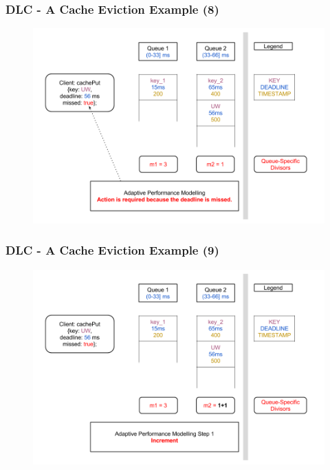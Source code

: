 \documentclass{beamer}
\begin{document}
\begin{frame}
  \frametitle{DLC - A Cache Eviction Example (8)}
  \begin{figure}
    \begin{center}
      \centerline{\includegraphics[scale=0.33]{img/DLC_V6_8.png}}
    \end{center}
  \end{figure}
\end{frame}

\begin{frame}
  \frametitle{DLC - A Cache Eviction Example (9)}
  \begin{figure}
    \begin{center}
      \centerline{\includegraphics[scale=0.33]{img/DLC_V6_9.png}}
    \end{center}
  \end{figure}
\end{frame}
\end{document}
